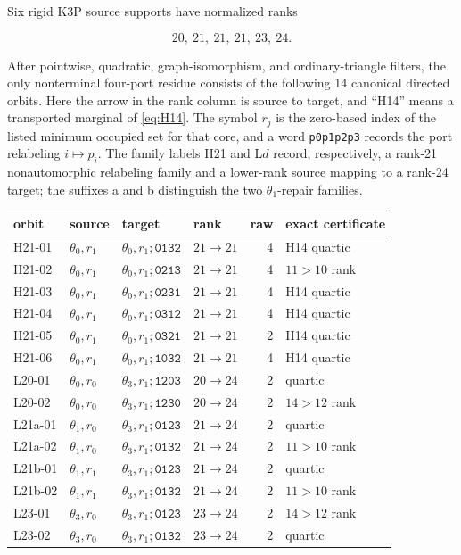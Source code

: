 Six rigid K3P source supports have normalized ranks

\[
 20,\ 21,\ 21,\ 21,\ 23,\ 24.
\]

After pointwise, quadratic, graph-isomorphism, and ordinary-triangle filters,
the only nonterminal four-port residue consists of the following 14
canonical directed orbits.  Here the arrow in the rank column is source to
target, and ``H14'' means a transported marginal of \eqref{eq:H14}.  The
symbol \(r_j\) is the zero-based index of the listed minimum occupied set for
that core, and a word \texttt{p0p1p2p3} records the port relabeling
\(i\mapsto p_i\).  The family labels H21 and L\(d\) record, respectively, a
rank-21 nonautomorphic relabeling family and a lower-rank source mapping to a
rank-24 target; the suffixes a and b distinguish the two
\(\theta_1\)-repair families.

{\small
\begin{longtable}{llllrl}
\toprule
orbit & source & target & rank & raw & exact certificate\\
\midrule
\endhead
H21-01 & \(\theta_0,r_1\) & \(\theta_0,r_1;\texttt{0132}\) & \(21\to21\) & 4 & H14 quartic\\
H21-02 & \(\theta_0,r_1\) & \(\theta_0,r_1;\texttt{0213}\) & \(21\to21\) & 4 & \(11>10\) rank\\
H21-03 & \(\theta_0,r_1\) & \(\theta_0,r_1;\texttt{0231}\) & \(21\to21\) & 4 & H14 quartic\\
H21-04 & \(\theta_0,r_1\) & \(\theta_0,r_1;\texttt{0312}\) & \(21\to21\) & 4 & H14 quartic\\
H21-05 & \(\theta_0,r_1\) & \(\theta_0,r_1;\texttt{0321}\) & \(21\to21\) & 2 & H14 quartic\\
H21-06 & \(\theta_0,r_1\) & \(\theta_0,r_1;\texttt{1032}\) & \(21\to21\) & 4 & H14 quartic\\
L20-01 & \(\theta_0,r_0\) & \(\theta_3,r_1;\texttt{1203}\) & \(20\to24\) & 2 & quartic\\
L20-02 & \(\theta_0,r_0\) & \(\theta_3,r_1;\texttt{1230}\) & \(20\to24\) & 2 & \(14>12\) rank\\
L21a-01 & \(\theta_1,r_0\) & \(\theta_3,r_1;\texttt{0123}\) & \(21\to24\) & 2 & quartic\\
L21a-02 & \(\theta_1,r_0\) & \(\theta_3,r_1;\texttt{0132}\) & \(21\to24\) & 2 & \(11>10\) rank\\
L21b-01 & \(\theta_1,r_1\) & \(\theta_3,r_1;\texttt{0123}\) & \(21\to24\) & 2 & quartic\\
L21b-02 & \(\theta_1,r_1\) & \(\theta_3,r_1;\texttt{0132}\) & \(21\to24\) & 2 & \(11>10\) rank\\
L23-01 & \(\theta_3,r_0\) & \(\theta_3,r_1;\texttt{0123}\) & \(23\to24\) & 2 & \(14>12\) rank\\
L23-02 & \(\theta_3,r_0\) & \(\theta_3,r_1;\texttt{0132}\) & \(23\to24\) & 2 & quartic\\
\bottomrule
\end{longtable}
}

